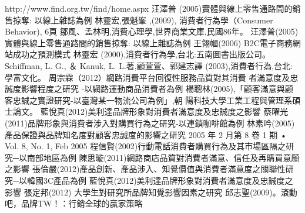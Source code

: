 \documentclass[a4paper,12pt]{report}
\begin{document}
\begin{thebibliography}{1}
http://www.find.org.tw/find/home.aspx
汪澤普 (2005)實體與線上零售通路間的銷售掠奪: 以線上雜誌為例
林靈宏,張魁峯 ,(2009), 消費者行為學（Consumer Behavior), 6頁
鄒風、孟林明,消費心理學,世界商業文庫,民國86年。
汪澤普(2005)實體與線上零售通路間的銷售掠奪: 以線上雜誌為例
王翎幗(2006) B2C電子商務網站成功之預測模式
林靈宏 (2000),消費者行為學,台北:五南圖書出版公司。
Schiffman, L. G.,  ＆ Kanuk, L. L.著,顧萱萱、郭建志譯 (2003),消費者行為,台北: 學富文化。
周宗霖（2012）網路消費平台回復性服務品質對其消費 者滿意度及忠誠度影響程度之研究 -以網路運動商品消費者為例
楊聰林(2005),「顧客滿意與顧客忠誠之實證研究-以臺灣某一物流公司為例」,朝
  陽科技大學工業工程與管理系碩士論文。
藍悅真(2012)美利達品牌形象對消費者滿意度及忠誠度之影響
蔡曜光(2011)品牌形象與消費者涉入對購買行為之研究-以連鎖咖啡館為例
林素吟(2005)產品保證與品牌知名度對顧客忠誠度的影響之研究 2005 年 2 月第 8 卷 1 期 • Vol. 8, No. 1, Feb 2005
程信賢(2002)行動電話消費者購買行為及其市場區隔之研究─以南部地區為例
陳思璇(2011)網路商店品質對消費者滿意、信任及再購買意願之影響
張倫嚴(2012)產品創新、產品涉入、知覺價值與消費者滿意度之關聯性研究─以韓國3C產品為例
藍悅真(2012)美利達品牌形象對消費者滿意度及忠誠度之影響
張定邦(2012) 大學生對研究所品牌知覺影響因素之研究
邱志聖(2009)。滾動吧，品牌TW！：行銷全球的贏家策略
\end{thebibliography}
\clearpage
\end{document}
